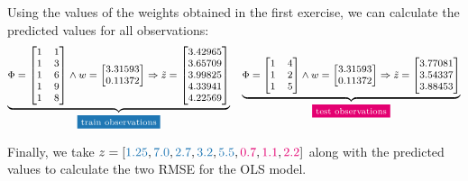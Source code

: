\documentclass[12pt]{article}
\begin{document}
\begin{enumerate}
    \vspace{10pt}
    Using the values of the weights obtained in the first exercise, we can calculate the predicted values for all observations:
    \begin{equation*}
        \footnotesize
        \underbrace{
        \Phi = \begin{bmatrix}
            1 & 1 \\
            1 & 3 \\
            1 & 6 \\
            1 & 9 \\
            1 & 8 
        \end{bmatrix} \land w = \begin{bmatrix}
            3.31593 \\
            0.11372
        \end{bmatrix} \Rightarrow \tilde{z} = \begin{bmatrix}
            3.42965 \\
            3.65709 \\
            3.99825 \\
            4.33941 \\
            4.22569
        \end{bmatrix} }_{\text{\colorbox{codeblue}{\textcolor{white}{train observations}}}}
        \quad \underbrace{
            \Phi = \begin{bmatrix}
            1 & 4 \\
            1 & 2 \\
            1 & 5 
        \end{bmatrix} \land w = \begin{bmatrix}
            3.31593 \\
            0.11372
        \end{bmatrix} \Rightarrow \tilde{z} = \begin{bmatrix}
            3.77081 \\
            3.54337 \\
            3.88453
        \end{bmatrix}
        }_{\text{\colorbox{codepink}{\textcolor{white}{test observations}}}}
    \end{equation*}

    Finally, we take $z = [\textcolor{codeblue}{1.25}, \textcolor{codeblue}{7.0}, \textcolor{codeblue}{2.7}, \textcolor{codeblue}{3.2}, \textcolor{codeblue}{5.5}, \textcolor{codepink}{0.7}, \textcolor{codepink}{1.1}, \textcolor{codepink}{2.2}]$ along with the predicted values to calculate the two RMSE for the OLS model.


\end{enumerate}
\end{document}
